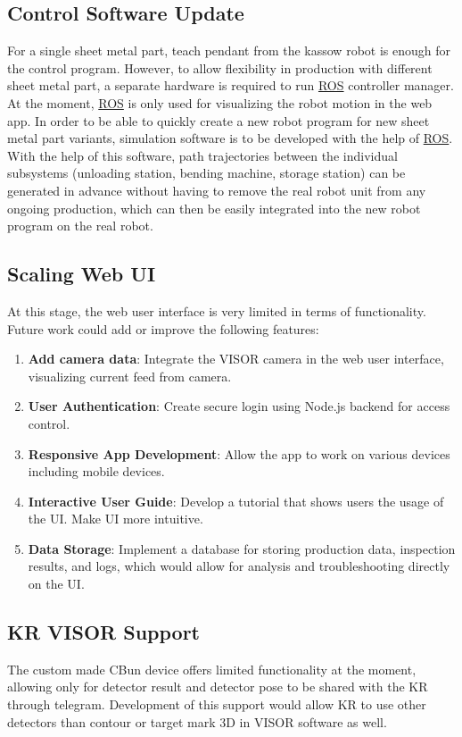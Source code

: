 \subsection{Control Software Update}
\label{subsec:control-software-update}
For a single sheet metal part, teach pendant from the kassow robot is enough for the control program.
However, to allow flexibility in production with different sheet metal part, a separate hardware is required
to run \hyperref[acro:ROS]{ROS} controller manager.
At the moment, \hyperref[acro:ROS]{ROS} is only used for visualizing the robot motion in the web app.
In order to be able to quickly create a new robot program for new sheet metal part variants, simulation
software is to be developed with the help of \hyperref[acro:ROS]{ROS}. With the help of this software, path trajectories between
the individual subsystems (unloading station, bending machine, storage station) can be generated in
advance without having to remove the real robot unit from any ongoing production, which can
then be easily integrated into the new robot program on the real robot.

\subsection{Scaling Web UI}
\label{subsec:web-ui-update}
At this stage, the web user interface is very limited in terms of functionality. Future work could add or improve the following features:
\begin{enumerate}
    \item \textbf{Add camera data}: Integrate the VISOR camera in the web user interface, visualizing current feed from camera.
    \item \textbf{User Authentication}: Create secure login using Node.js backend for access control.
    \item \textbf{Responsive App Development}: Allow the app to work on various devices including mobile devices.
    \item \textbf{Interactive User Guide}: Develop a tutorial that shows users the usage of the UI. Make UI more intuitive.
    \item \textbf{Data Storage}: Implement a database for storing production data, inspection results, and logs, which would allow for analysis and troubleshooting directly on the UI.
\end{enumerate}

\subsection{KR VISOR Support}
The custom made CBun device offers limited functionality at the moment, allowing only for detector result and detector pose to be shared with the KR through telegram. Development of this support would allow KR to use other detectors than contour or target mark 3D in VISOR software as well.


